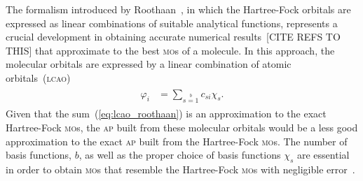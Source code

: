 The formalism introduced by Roothaan~\cite{Roothaan_HF}, in which the
Hartree-Fock orbitals are expressed as linear combinations of suitable
analytical functions, represents a crucial development in obtaining
accurate numerical results~[CITE REFS TO THIS] that approximate to the
best \textsc{mo}s of a molecule. In this approach, the molecular
orbitals are expressed by a linear combination of atomic
orbitals~(\textsc{lcao})~\cite{Roothaan_HF}
%
\begin{eqnarray}
  \begin{split}
    \varphi_{i} & = \sum\limits_{s=1}\limits^{b} c_{si} \chi_{s}.
  \end{split}
  \label{eq:lcao_roothaan}
\end{eqnarray}
%
Given that the sum~(\ref{eq:lcao_roothaan}) is an approximation to the
exact Hartree-Fock \textsc{mo}s, the \textsc{ap} built from these
molecular orbitals would be a less good approximation to the exact
\textsc{ap} built from the Hartree-Fock \textsc{mo}s. The number of
basis functions, $b$, as well as the proper choice of basis functions
$\chi_{s}$ are essential in order to obtain \textsc{mo}s that resemble
the Hartree-Fock \textsc{mo}s with negligible
error~\cite{Moccia_JCP_2164,Moccia_JCP_2176,Moccia_1964}.

